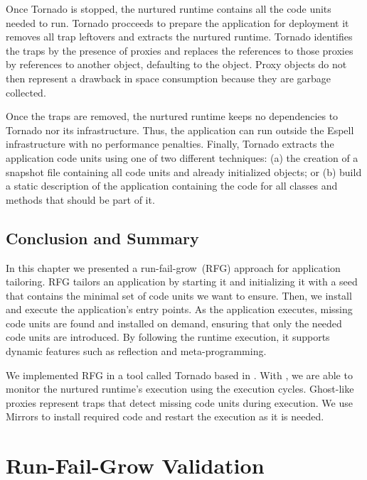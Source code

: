 Once Tornado is stopped, the nurtured runtime contains all the code units needed to run. Tornado procceeds to prepare the application for deployment \ie it removes all trap leftovers and extracts the nurtured runtime. Tornado identifies the traps by the presence of proxies and replaces the references to those proxies by references to another object, defaulting to the  object. Proxy objects do not then represent a drawback in space consumption because they are garbage collected. %

Once the traps are removed, the nurtured runtime keeps no dependencies to Tornado nor its infrastructure. Thus, the application can run outside the Espell infrastructure with no performance penalties. Finally, Tornado extracts the application code units using one of two different techniques: (a) the creation of a snapshot file containing all code units and already initialized objects; or (b) build a static description of the application containing the code for all classes and methods that should be part of it.

\section{Conclusion and Summary}

In this chapter we presented a run-fail-grow~(RFG) approach for application tailoring. RFG tailors an application by starting it and initializing it with a seed that contains the minimal set of code units we want to ensure. Then, we install and execute the application's entry points. As the application executes, missing code units are found and installed on demand, ensuring that only the needed code units are introduced. By following the runtime execution, it supports dynamic features such as reflection and meta-programming.

We implemented RFG in a tool called Tornado based in \Vtt. With \Vtt, we are able to monitor the nurtured runtime's execution using the execution cycles. Ghost-like proxies represent traps that detect missing code units during execution. We use Mirrors to install required code and restart the execution as it is needed.

\chapter{Run-Fail-Grow Validation}
\minitoc
\introduction


